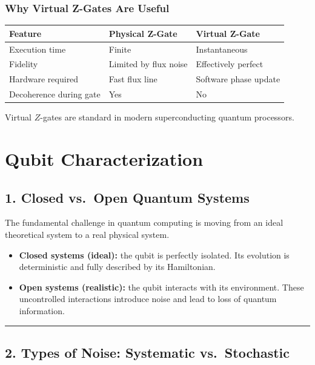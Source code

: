 \documentclass[
]{article}
\providecommand{\tightlist}{%
  \setlength{\itemsep}{0pt}\setlength{\parskip}{0pt}}
\begin{document}
\subsubsection{Why Virtual Z-Gates Are
Useful}\label{why-virtual-z-gates-are-useful}

\begin{longtable}[]{@{}lll@{}}
\toprule\noalign{}
Feature & Physical Z-Gate & Virtual Z-Gate \\
\midrule\noalign{}
\endhead
\bottomrule\noalign{}
\endlastfoot
Execution time & Finite & Instantaneous \\
Fidelity & Limited by flux noise & Effectively perfect \\
Hardware required & Fast flux line & Software phase update \\
Decoherence during gate & Yes & No \\
\end{longtable}

Virtual \(Z\)-gates are standard in modern superconducting quantum
processors.

\section{Qubit Characterization}\label{qubit-characterization}

\subsection{1. Closed vs.~Open Quantum
Systems}\label{closed-vs.-open-quantum-systems}

The fundamental challenge in quantum computing is moving from an ideal
theoretical system to a real physical system.

\begin{itemize}
\tightlist
\item
  \textbf{Closed systems (ideal):} the qubit is perfectly isolated. Its
  evolution is deterministic and fully described by its Hamiltonian.
\item
  \textbf{Open systems (realistic):} the qubit interacts with its
  environment. These uncontrolled interactions introduce noise and lead
  to loss of quantum information.
\end{itemize}

\begin{center}\rule{0.5\linewidth}{0.5pt}\end{center}

\subsection{2. Types of Noise: Systematic
vs.~Stochastic}\label{types-of-noise-systematic-vs.-stochastic}
\end{document}

